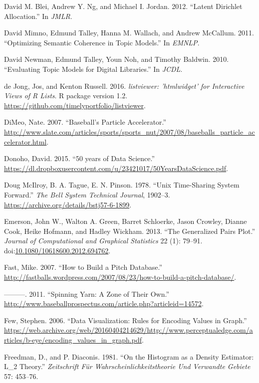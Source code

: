 \documentclass[12pt,]{isuthesis}
\begin{document}
\hypertarget{ref-Blei-2003}{}
David M. Blei, Andrew Y. Ng, and Michael I. Jordan. 2012. ``Latent
Dirichlet Allocation.'' In \emph{JMLR}.

\hypertarget{ref-Mimno}{}
David Mimno, Edmund Talley, Hanna M. Wallach, and Andrew McCallum. 2011.
``Optimizing Semantic Coherence in Topic Models.'' In \emph{EMNLP}.

\hypertarget{ref-Newman-JCDL}{}
David Newman, Edmund Talley, Youn Noh, and Timothy Baldwin. 2010.
``Evaluating Topic Models for Digital Libraries.'' In \emph{JCDL}.

\hypertarget{ref-listviewer}{}
de Jong, Jos, and Kenton Russell. 2016. \emph{listviewer: 'htmlwidget'
for Interactive Views of R Lists}. R package version 1.2.
\url{https://github.com/timelyportfolio/listviewer}.

\hypertarget{ref-slate}{}
DiMeo, Nate. 2007. ``Baseball's Particle Accelerator.''
\url{http://www.slate.com/articles/sports/sports_nut/2007/08/baseballs_particle_accelerator.html}.

\hypertarget{ref-Donoho:2015tu}{}
Donoho, David. 2015. ``50 years of Data Science.''
\url{https://dl.dropboxusercontent.com/u/23421017/50YearsDataScience.pdf}.

\hypertarget{ref-unix}{}
Doug McIlroy, B. A. Tague, E. N. Pinson. 1978. ``Unix Time-Sharing
System Forward.'' \emph{The Bell System Technical Journal}, 1902--3.
\url{https://archive.org/details/bstj57-6-1899}.

\hypertarget{ref-gpp}{}
Emerson, John W., Walton A. Green, Barret Schloerke, Jason Crowley,
Dianne Cook, Heike Hofmann, and Hadley Wickham. 2013. ``The Generalized
Pairs Plot.'' \emph{Journal of Computational and Graphical Statistics}
22 (1): 79--91.
doi:\href{https://doi.org/10.1080/10618600.2012.694762}{10.1080/10618600.2012.694762}.

\hypertarget{ref-database}{}
Fast, Mike. 2007. ``How to Build a Pitch Database.''
\url{http://fastballs.wordpress.com/2007/08/23/how-to-build-a-pitch-database/}.

\hypertarget{ref-Strikezones}{}
---------. 2011. ``Spinning Yarn: A Zone of Their Own.''
\url{http://www.baseballprospectus.com/article.php?articleid=14572}.

\hypertarget{ref-few-values}{}
Few, Stephen. 2006. ``Data Visualization: Rules for Encoding Values in
Graph.''
\url{https://web.archive.org/web/20160404214629/http://www.perceptualedge.com/articles/b-eye/encoding_values_in_graph.pdf}.

\hypertarget{ref-FD}{}
Freedman, D., and P. Diaconis. 1981. ``On the Histogram as a Density
Estimator: L\_2 Theory.'' \emph{Zeitschrift Für
Wahrscheinlichkeitstheorie Und Verwandte Gebiete} 57: 453--76.
\end{document}
